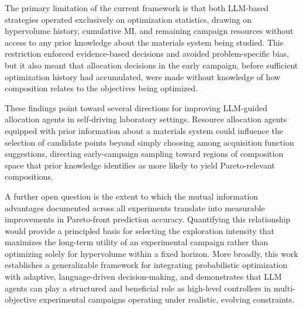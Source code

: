 The primary limitation of the current framework is that both LLM-based strategies operated exclusively on optimization statistics, drawing on hypervolume history, cumulative MI, and remaining campaign resources without access to any prior knowledge about the materials system being studied. This restriction enforced evidence-based decisions and avoided problem-specific bias, but it also meant that allocation decisions in the early campaign, before sufficient optimization history had accumulated, were made without knowledge of how composition relates to the objectives being optimized.

These findings point toward several directions for improving LLM-guided allocation agents in self-driving laboratory settings. Resource allocation agents equipped with prior information about a materials system could influence the selection of candidate points beyond simply choosing among acquisition function suggestions, directing early-campaign sampling toward regions of composition space that prior knowledge identifies as more likely to yield Pareto-relevant compositions. 

A further open question is the extent to which the mutual information advantages documented across all experiments translate into measurable improvements in Pareto-front prediction accuracy. Quantifying this relationship would provide a principled basis for selecting the exploration intensity that maximizes the long-term utility of an experimental campaign rather than optimizing solely for hypervolume within a fixed horizon. More broadly, this work establishes a generalizable framework for integrating probabilistic optimization with adaptive, language-driven decision-making, and demonstrates that LLM agents can play a structured and beneficial role as high-level controllers in multi-objective experimental campaigns operating under realistic, evolving constraints.